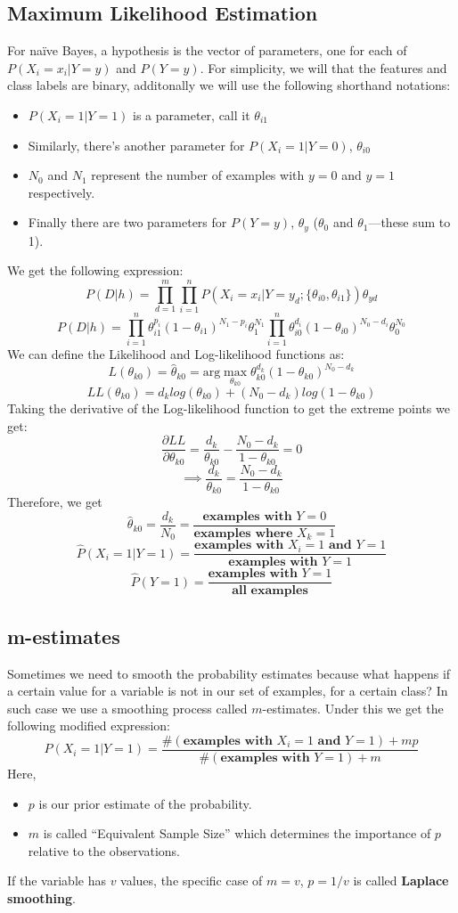 \documentclass[12pt, a4paper]{book}
\begin{document}
\subsection{Maximum Likelihood Estimation}
For naïve Bayes, a hypothesis is the vector of parameters, one for each of $P(X_i=x_i|Y=y)$ and $P(Y=y)$. For simplicity, we will that the features and class labels are binary, additonally we will use the following shorthand notations:
\begin{itemize}
    \item $P(X_i=1|Y=1)$ is a parameter, call it $\theta_{i1}$
    \item Similarly, there’s another parameter for $P(X_i=1|Y=0)$, $\theta_{i0}$
    \item $N_0$ and $N_1$ represent the number of examples with $y=0$ and $y=1$ respectively.
    \item Finally there are two parameters for $P(Y=y)$, $\theta_y$ ($\theta_0$ and $\theta_1$—these sum to 1).
\end{itemize}
We get the following expression:
$$P(D|h ) = \prod_{d=1}^m\prod_{i=1}^nP(X_i = x_i | Y = y_d ; \{\theta_{i0} , \theta_{i1} \} ) \theta_{yd}$$
$$P(D|h) = \prod_{i=1}^n\theta_{i1}^{p_i}(1-\theta_{i1})^{N_1-p_i}\theta^{N_1}_1\prod_{i=1}^n\theta_{i0}^{d_i}(1-\theta_{i0})^{N_0-d_i}\theta^{N_0}_0$$
We can define the Likelihood and Log-likelihood functions as:
$$L(\theta_{k0}) =\hat{\theta}_{k0} = \text{arg}\max_{\theta_{k0}} \theta_{k0}^{d_k}(1-\theta_{k0})^{N_0-d_k}$$
$$LL(\theta_{k0}) = d_klog(\theta_{k0})+(N_0-d_k)log(1-\theta_{k0})$$
Taking the derivative of the Log-likelihood function to get the extreme points we get:
$$\frac{\partial LL}{\partial \theta_{k0}}=\frac{d_k}{\theta_{k0}} - \frac{N_0 - d_k}{1-\theta_{k0}} = 0$$
$$\implies \frac{d_k}{\theta_{k0}} = \frac{N_0 - d_k}{1-\theta_{k0}}$$
Therefore, we get
$$\hat{\theta}_{k0}=\frac{d_k}{N_0} = \frac{\textbf{examples with $Y=0$}}{\textbf{examples where $X_k=1$}}$$
$$\hat{P}(X_i=1|Y=1) = \frac{\textbf{examples with $X_i = 1$ and $Y=1$}}{\textbf{examples with $Y = 1$}}$$
$$\hat{P}(Y=1) = \frac{\textbf{examples with $Y=1$}}{\textbf{all examples}}$$

\subsection{m-estimates}
Sometimes we need to smooth the probability estimates because what happens if a certain value for a variable is not in our set of examples, for a certain class? In such case we use a smoothing process called $m$-estimates. Under this we get the following modified expression:
$$\hat{P}(X_i=1|Y=1) = \frac{\#(\textbf{examples with $X_i = 1$ and $Y=1$}) + mp}{\#(\textbf{examples with $Y = 1$}) + m}$$
Here,
\begin{itemize}
    \item $p$ is our prior estimate of the probability.
    \item $m$ is called “Equivalent Sample Size” which determines the importance of $p$ relative to the observations.
\end{itemize}
If the variable has $v$ values, the specific case of $m=v$, $p=1/v$ is called \textbf{Laplace smoothing}.
\end{document}
